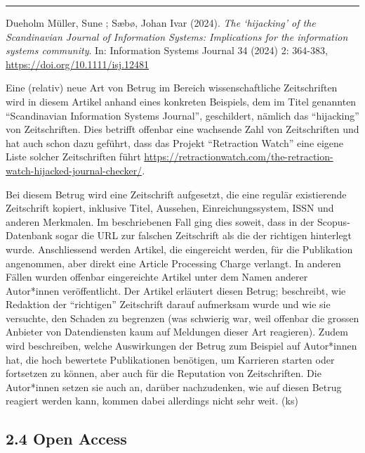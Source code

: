 \documentclass[a4paper,
fontsize=11pt,
oneside,
numbers=noperiodatend,
parskip=half-,
bibliography=totoc,
final
]{scrartcl}
\begin{document}
\begin{center}\rule{0.5\linewidth}{0.5pt}\end{center}

Dueholm Müller, Sune ; Sæbø, Johan Ivar (2024). \emph{The
\enquote*{hijacking} of the Scandinavian Journal of Information Systems:
Implications for the information systems community}. In: Information
Systems Journal 34 (2024) 2: 364-383,
\url{https://doi.org/10.1111/isj.12481}

Eine (relativ) neue Art von Betrug im Bereich wissenschaftliche
Zeitschriften wird in diesem Artikel anhand eines konkreten Beispiels,
dem im Titel genannten \enquote{Scandinavian Information Systems
Journal}, geschildert, nämlich das \enquote{hijacking} von
Zeitschriften. Dies betrifft offenbar eine wachsende Zahl von
Zeitschriften und hat auch schon dazu geführt, dass das Projekt
\enquote{Retraction Watch} eine eigene Liste solcher Zeitschriften führt
\url{https://retractionwatch.com/the-retraction-watch-hijacked-journal-checker/}.

Bei diesem Betrug wird eine Zeitschrift aufgesetzt, die eine regulär
existierende Zeitschrift kopiert, inklusive Titel, Aussehen,
Einreichungssystem, ISSN und anderen Merkmalen. Im beschriebenen Fall
ging dies soweit, dass in der Scopus-Datenbank sogar die URL zur
falschen Zeitschrift als die der richtigen hinterlegt wurde.
Anschliessend werden Artikel, die eingereicht werden, für die
Publikation angenommen, aber direkt eine Article Processing Charge
verlangt. In anderen Fällen wurden offenbar eingereichte Artikel unter
dem Namen anderer Autor*innen veröffentlicht. Der Artikel erläutert
diesen Betrug; beschreibt, wie Redaktion der \enquote{richtigen}
Zeitschrift darauf aufmerksam wurde und wie sie versuchte, den Schaden
zu begrenzen (was schwierig war, weil offenbar die grossen Anbieter von
Datendiensten kaum auf Meldungen dieser Art reagieren). Zudem wird
beschreiben, welche Auswirkungen der Betrug zum Beispiel auf Autor*innen
hat, die hoch bewertete Publikationen benötigen, um Karrieren starten
oder fortsetzen zu können, aber auch für die Reputation von
Zeitschriften. Die Autor*innen setzen sie auch an, darüber nachzudenken,
wie auf diesen Betrug reagiert werden kann, kommen dabei allerdings
nicht sehr weit. (ks)

\hypertarget{open-access}{%
\subsection{2.4 Open Access}\label{open-access}}
\end{document}
